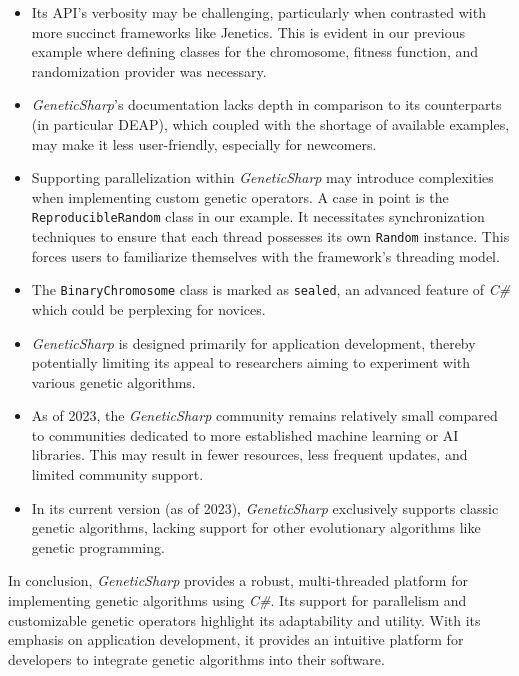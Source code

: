   \begin{itemize}
    \item Its API's verbosity may be challenging, particularly when contrasted 
      with more succinct frameworks like Jenetics.
      This is evident in our previous example where defining classes for the 
      chromosome, fitness function, and randomization provider was necessary.
    \item \textit{GeneticSharp}'s documentation lacks depth in comparison to 
      its counterparts (in particular DEAP), which coupled with the shortage of 
      available examples, may make it less user-friendly, especially for 
      newcomers.
    \item Supporting parallelization within \textit{GeneticSharp} may introduce 
      complexities when implementing custom genetic operators.
      A case in point is the \texttt{ReproducibleRandom} class in our example.
      It necessitates synchronization techniques to ensure that each thread 
      possesses its own \texttt{Random} instance.
      This forces users to familiarize themselves with the framework's 
      threading model.
    \item The \texttt{BinaryChromosome} class is marked as 
      \texttt{sealed}, an advanced feature of \textit{C\#} which 
      could be perplexing for novices.
    \item \textit{GeneticSharp} is designed primarily for application 
      development, thereby potentially limiting its appeal to researchers 
      aiming to experiment with various genetic algorithms.
    \item As of 2023, the \textit{GeneticSharp} community remains relatively 
      small compared to communities dedicated to more established machine 
      learning or AI libraries.
      This may result in fewer resources, less frequent updates, and limited 
      community support.
    \item In its current version (as of 2023), \textit{GeneticSharp} 
      exclusively supports classic genetic algorithms, lacking support for 
      other evolutionary algorithms like genetic programming.
  \end{itemize}
  
  In conclusion, \textit{GeneticSharp} provides a robust, multi-threaded 
  platform for implementing genetic algorithms using \textit{C\#}.
  Its support for parallelism and customizable genetic operators highlight its 
  adaptability and utility.
  With its emphasis on application development, it provides an intuitive 
  platform for developers to integrate genetic algorithms into their software.

